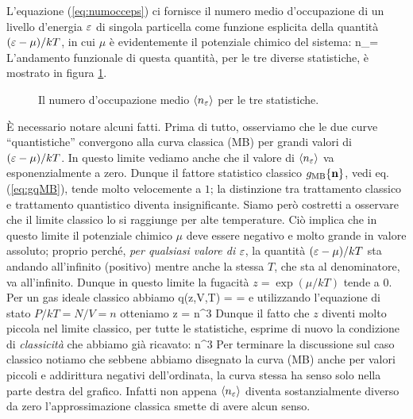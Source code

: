 L'equazione (\ref{eq:numocceps}) ci fornisce il numero medio d'occupazione di un livello d'energia $\varepsilon$ di singola particella come funzione esplicita della quantità $(\varepsilon-\mu)/kT$, in cui $\mu$ è evidentemente il potenziale chimico del sistema:
\be
\langle n_\eps\rangle = 
\ee
L'andamento funzionale di questa quantità, per le tre diverse statistiche, è mostrato in figura \ref{fig:numocc}.
\begin{figure}[h!t]
  \centering
{}
  \caption{Il numero d'occupazione medio $\langle n_\varepsilon\rangle$ per le tre statistiche.} 
  \label{fig:numocc}
\end{figure}
È necessario notare alcuni fatti. Prima di tutto, osserviamo che le due curve ``quantistiche'' convergono alla curva classica (MB) per grandi valori di $(\varepsilon-\mu)/kT$. In questo limite vediamo anche che il valore di $\langle n_\varepsilon\rangle$ va esponenzialmente a zero. Dunque il fattore statistico classico $g_{\text{MB}}{\{\mathbf{n}\}}$, vedi eq. (\ref{eq:gqMB}), tende molto velocemente a $1$; la distinzione tra trattamento classico e trattamento quantistico diventa insignificante. Siamo però costretti a osservare che il limite classico lo si raggiunge per alte temperature. Ciò implica che in questo limite il potenziale chimico $\mu$ deve essere negativo e molto grande in valore assoluto; proprio perché, {\em per qualsiasi valore di} $\varepsilon$, la quantità $(\varepsilon-\mu)/kT$ sta andando all'infinito (positivo) mentre anche la stessa $T$, che sta al denominatore, va all'infinito. Dunque in questo limite la fugacità $z = \exp(\mu/kT)$ tende a $0$. Per un gas ideale classico abbiamo
\be
q(z,V,T) =  = 
\ee
e utilizzando l'equazione di stato $P/kT = N/V = n$ otteniamo
\be
z = n\lambda^3
\ee
Dunque il fatto che $z$ diventi molto piccola nel limite classico, per tutte le statistiche, esprime di nuovo la condizione di {\em classicità} che abbiamo già ricavato:
\be
n\lambda^3 
\ee
Per terminare la discussione sul caso classico notiamo che sebbene abbiamo disegnato la curva (MB) anche per valori piccoli e addirittura negativi dell'ordinata, la curva stessa ha senso solo nella parte destra del grafico. Infatti non appena $\langle n_\varepsilon\rangle$ diventa sostanzialmente diverso da zero l'approssimazione classica smette di avere alcun senso.

